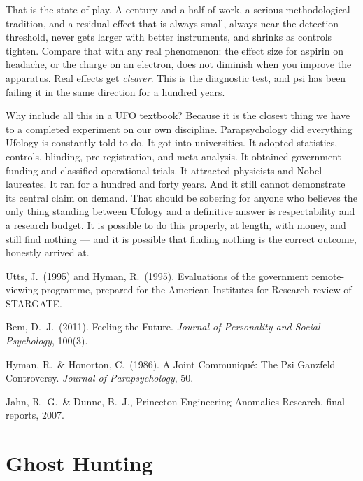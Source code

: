 That is the state of play. A century and a half of work, a serious methodological tradition, and a
residual effect that is always small, always near the detection threshold, never gets larger with
better instruments, and shrinks as controls tighten. Compare that with any real phenomenon: the
effect size for aspirin on headache, or the charge on an electron, does not diminish when you
improve the apparatus. Real effects get \emph{clearer}. This is the diagnostic test, and psi has
been failing it in the same direction for a hundred years.


Why include all this in a UFO textbook? Because it is the closest thing we have to a completed
experiment on our own discipline. Parapsychology did everything Ufology is constantly told to do.
It got into universities. It adopted statistics, controls, blinding, pre-registration, and
meta-analysis. It obtained government funding and classified operational trials. It attracted
physicists and Nobel laureates. It ran for a hundred and forty years. And it still cannot
demonstrate its central claim on demand. That should be sobering for anyone who believes the only
thing standing between Ufology and a definitive answer is respectability and a research budget. It
is possible to do this properly, at length, with money, and still find nothing --- and it is
possible that finding nothing is the correct outcome, honestly arrived at.

\begin{srcnotes}
\item Utts, J.\ (1995) and Hyman, R.\ (1995). Evaluations of the government remote-viewing
programme, prepared for the American Institutes for Research review of STARGATE.
\item Bem, D.\ J.\ (2011). Feeling the Future. \emph{Journal of Personality and Social
Psychology}, 100(3).
\item Hyman, R.\ \& Honorton, C.\ (1986). A Joint Communiqu\'e: The Psi Ganzfeld Controversy.
\emph{Journal of Parapsychology}, 50.
\item Jahn, R.\ G.\ \& Dunne, B.\ J., Princeton Engineering Anomalies Research, final reports,
2007.
\end{srcnotes}

\section{Ghost Hunting}\label{sec:ghosthunting}

